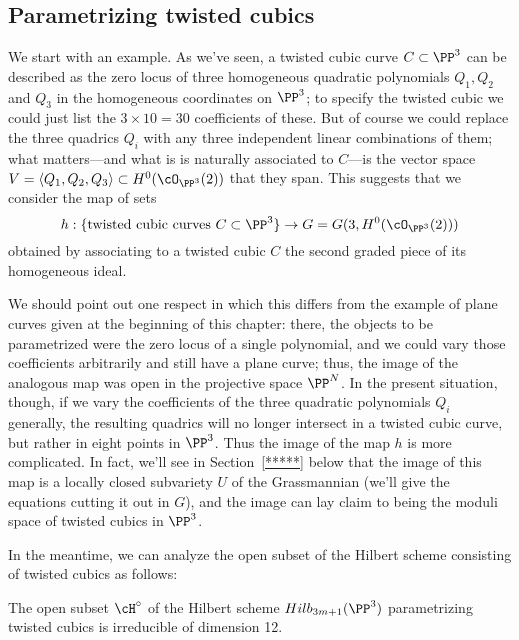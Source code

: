 \subsection{Parametrizing twisted cubics} We  start with an example. As we've seen, a twisted cubic curve $C \subset \PP^3$ can be described as the zero locus of three homogeneous quadratic polynomials $Q_1, Q_2$ and $Q_3$ in the homogeneous coordinates on $\PP^3$; to specify the twisted cubic we could just list the $3 \times 10 = 30$ coefficients of these. But of course we could replace the three quadrics $Q_i$ with any three independent linear combinations of them; what matters---and what is is naturally associated to $C$---is the vector space $V = \langle Q_1, Q_2, Q_3 \rangle \subset H^0(\cO_{\PP^3}(2))$ that they span. This suggests that we consider the map of sets
$$
h : \{ \text{twisted cubic curves } C \subset \PP^3 \} \to G = G(3, H^0(\cO_{\PP^3}(2)))
$$
obtained by associating to a twisted cubic $C$ the second graded piece of its homogeneous ideal. 

We should point out one respect in which this differs from the example of plane curves given at the beginning of this chapter: there, the objects to be parametrized were the zero locus of a single polynomial, and we could vary those coefficients arbitrarily and still have a plane curve; thus, the image of the analogous map was open in the projective space $\PP^N$. In the present situation, though, if we vary the coefficients of the three quadratic polynomials $Q_i$ generally, the resulting quadrics will no longer intersect in a twisted cubic curve, but rather in eight points in $\PP^3$. Thus the image of the map $h$ is more complicated.
In fact, we'll see in Section~\ref{*****} below that the image of this map is a locally closed subvariety $U$ of the Grassmannian (we'll give the equations cutting it out in $G$), and the image can lay claim to being the moduli space of twisted cubics in $\PP^3$.

In the meantime, we can analyze the open subset of the Hilbert scheme consisting of twisted cubics as follows:

\begin{proposition}\label{hilb of twisted cubics}
The open subset $\cH^\circ$ of the Hilbert scheme $Hilb_{3m+1}(\PP^3)$ parametrizing twisted cubics is irreducible of dimension 12.
\end{proposition}

